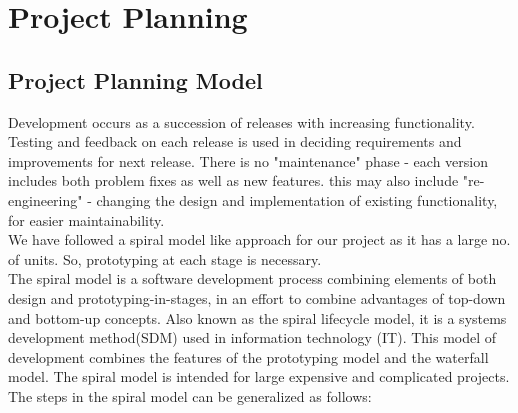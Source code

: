 \chapter{Project Planning}
\section{Project Planning Model}
\hspace*{0.82cm}Development occurs as a succession of releases with increasing functionality. Testing and feedback on each release is 
used in deciding requirements and improvements for next release. There is no "maintenance" phase - each version includes both problem 
fixes as well as new features. this may also include "re-engineering" - changing the design and implementation of existing 
functionality, for easier maintainability.\\[0.5cm]
\hspace*{0.82cm}We have followed a spiral model like approach for our project as it has a large no. of units. 
So, prototyping at each stage is necessary.\\[0.5cm]
\hspace*{0.82cm}The spiral model is a software development process combining elements of both design and prototyping-in-stages, 
in an effort to combine advantages of top-down and bottom-up concepts. Also known as the spiral lifecycle model, 
it is a systems development method(SDM) used in information technology (IT). 
This model of development combines the features of the prototyping model and the waterfall model. 
The spiral model is intended for large expensive and complicated projects.\\[0.5cm]
The steps in the spiral model can be generalized as follows:
